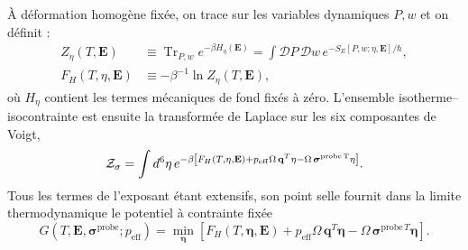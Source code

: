 À déformation homogène fixée, on trace sur les variables dynamiques $P,w$ et
on définit :
\begin{equation}
\begin{aligned}
Z_{\eta}(T,\mathbf E)&\equiv
\operatorname{Tr}_{P,w}e^{-\beta H_\eta(\mathbf E)}
=\int\mathcal DP\,\mathcal Dw\,
e^{-S_E[P,w;\eta,\mathbf E]/\hbar},\\
F_H(T,\eta,\mathbf E)&\equiv-\beta^{-1}\ln Z_\eta(T,\mathbf E),
\end{aligned}
\label{eq:core_piezo_fixed_strain_helmholtz}
\end{equation}
où $H_\eta$ contient les termes mécaniques de fond fixés à zéro. L'ensemble
isotherme--isocontrainte est ensuite la transformée de Laplace sur les six
composantes de Voigt,
\begin{equation}
\mathcal Z_{\sigma}=
\int d^6\eta\,
e^{-\beta\left[F_H(T,\eta,\mathbf E)
+p_{\rm eff}\Omega\,\mathbf q^T\eta
-\Omega\,\boldsymbol\sigma^{\rm probe\,T}\eta\right]}.
\label{eq:core_piezo_isostress_partition_function}
\end{equation}
Tous les termes de l'exposant étant extensifs, son point selle fournit dans la
limite thermodynamique le potentiel à contrainte fixée
\begin{equation}
G(T,\mathbf E,\boldsymbol\sigma^{\mathrm{probe}};p_{\mathrm{eff}})
=\min_{\boldsymbol\eta}\left[
F_H(T,\boldsymbol\eta,\mathbf E)
+p_{\mathrm{eff}}\Omega\,\mathbf q^T\boldsymbol\eta
-\Omega\,\boldsymbol\sigma^{\mathrm{probe}\,T}\boldsymbol\eta
\right].
\label{eq:core_piezo_gibbs}
\end{equation}

